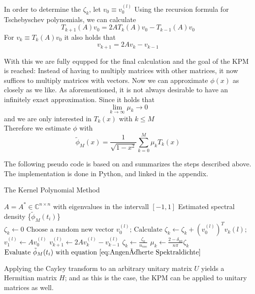 In order to determine the $\zeta_k$, let $v_0 \equiv v_0^{(l)}$
Using the recursion formula for Tschebyschev polynomials, we can calculate
\[
T_{k + 1}(A)v_0 = 2 A T_k(A) v_0 - T_{k - 1}(A) v_0
\]
For $v_k \equiv T_k(A)v_0$ it also holds that
\[
v_{k + 1} = 2 A v_k - v_{k - 1}
\]

With this we are fully equpped for the final calculation and the goal of the KPM is reached:
Instead of having to multiply matrices with other matrices, it now suffices to multiply matrices with vectors.
Now we can approximate $\phi(x)$ as closely as we like.
As aforementioned, it is not always desirable to have an infinitely exact approximation.
Since it holds that
\[
\lim \limits_{k \to \infty} \mu_k \to 0
\]
and we are only interested in $T_k(x)$ with $k \leq M$\\
Therefore we estimate $\phi$ with
\begin{equation} \label{eq:Angenäherte Spektraldichte}
    \tilde{\phi}_M(x) = \frac{1}{\sqrt{1 - x^2}} \sum_{k = 0}^{M} \mu_k T_k(x)
\end{equation}

The following pseudo code is based on \cite[p.~10]{linsaadyang14} and summarizes the steps described above.
The implementation is done in Python, and linked in the appendix.

\begin{algorithm}
    \caption{The Kernel Polynomial Method}\label{alg:cap}
    \begin{algorithmic}[5]
    \Require $A = A^* \in \mathbb{C}^{n \times n}$ with eigenvalues in the intervall $[-1, 1]$
    \Ensure Estimated spectral density \{$\tilde{\phi}_M(t_i)$\}\\
    \State $\zeta_k \gets 0$
    \EndFor
    \State $\text{Choose a random new vector } v_0^{(l)}\text{;}$ 
    \State $\text{Calculate } \zeta_k \gets \zeta_k + \left( v_0^{(l)} \right)^T v_k{(l)}\text{;}$  
    \State $v_1^{(l)} \gets A v_0^{(l)}$
    \Else
    \State $v_{k+1}^{(l)} \gets 2 A v_k^{(l)} - v_{k-1}^{(l)}$ 
    \EndIf
    \EndFor
    \EndFor
    \State $\zeta_k \gets \frac{\zeta_k}{n_{\text{vec}}}$
    \State $\mu_k \gets \frac{2 - \delta_{k0}}{n \pi} \zeta_k$
    \EndFor
    \State $\text{Evaluate } \tilde{\phi}_M(t_i) \text{ with equation } \ref{eq:Angenäherte Spektraldichte}$
    \end{algorithmic}
\end{algorithm}

Applying the Cayley transform to an arbitrary unitary matrix $U$ yields a Hermitian matrix $H$;
and as this is the case, the KPM can be applied to unitary matrices as well.